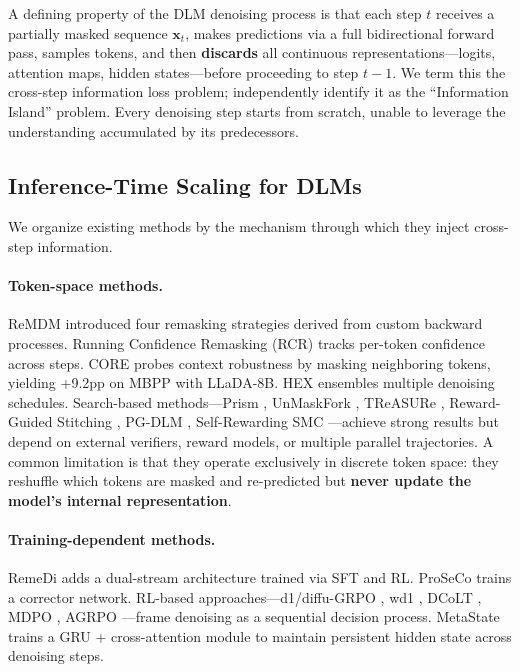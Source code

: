 \documentclass{article}
\begin{document}
A defining property of the DLM denoising process is that each step $t$ receives a partially masked sequence $\mathbf{x}_t$, makes predictions via a full bidirectional forward pass, samples tokens, and then \textbf{discards} all continuous representations---logits, attention maps, hidden states---before proceeding to step $t{-}1$. We term this the cross-step information loss problem; \citet{xia2026metastate} independently identify it as the ``Information Island'' problem. Every denoising step starts from scratch, unable to leverage the understanding accumulated by its predecessors.

\subsection{Inference-Time Scaling for DLMs}

We organize existing methods by the mechanism through which they inject cross-step information.

\paragraph{Token-space methods.} ReMDM \citep{arriola2025remdm} introduced four remasking strategies derived from custom backward processes. Running Confidence Remasking (RCR) \citep{chen2025mdpo} tracks per-token confidence across steps. CORE \citep{zhai2026core} probes context robustness by masking neighboring tokens, yielding +9.2pp on MBPP with LLaDA-8B. HEX \citep{lee2025hex} ensembles multiple denoising schedules. Search-based methods---Prism \citep{wang2026prism}, UnMaskFork \citep{li2026unmaskfork}, TReASURe \citep{chen2025treasure}, Reward-Guided Stitching \citep{stitching2026}, PG-DLM \citep{pgdlm2025}, Self-Rewarding SMC \citep{srsmc2026}---achieve strong results but depend on external verifiers, reward models, or multiple parallel trajectories. A common limitation is that they operate exclusively in discrete token space: they reshuffle which tokens are masked and re-predicted but \textbf{never update the model's internal representation}.

\paragraph{Training-dependent methods.} RemeDi \citep{xu2025remedi} adds a dual-stream architecture trained via SFT and RL. ProSeCo \citep{proseco2026} trains a corrector network. RL-based approaches---d1/diffu-GRPO \citep{d12025}, wd1 \citep{wd12025}, DCoLT \citep{dcolt2025}, MDPO \citep{chen2025mdpo}, AGRPO \citep{agrpo2025}---frame denoising as a sequential decision process. MetaState \citep{xia2026metastate} trains a GRU + cross-attention module to maintain persistent hidden state across denoising steps.
\end{document}
